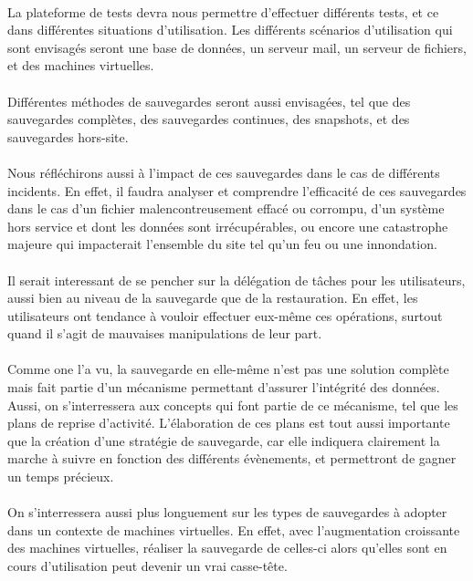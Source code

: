 \documentclass[a4paper,11pt]{report}
\begin{document}
\paragraph{}
La plateforme de tests devra nous permettre d'effectuer différents tests, et ce dans différentes situations d'utilisation.
Les différents scénarios d'utilisation qui sont envisagés seront une base de données, un serveur mail, un serveur de fichiers, et des machines virtuelles.

\paragraph{}
Différentes méthodes de sauvegardes seront aussi envisagées, tel que des sauvegardes complètes, des sauvegardes continues, des snapshots, et des sauvegardes hors-site.

\paragraph{}
Nous réfléchirons aussi à l'impact de ces sauvegardes dans le cas de différents incidents.
En effet, il faudra analyser et comprendre l'efficacité de ces sauvegardes dans le cas d'un fichier malencontreusement effacé ou corrompu, d'un système hors service et dont les données sont irrécupérables, ou encore une catastrophe majeure qui impacterait l'ensemble du site tel qu'un feu ou une innondation.

\paragraph{}
Il serait interessant de se pencher sur la délégation de tâches pour les utilisateurs, aussi bien au niveau de la sauvegarde que de la restauration.
En effet, les utilisateurs ont tendance à vouloir effectuer eux-même ces opérations, surtout quand il s'agit de mauvaises manipulations de leur part.

\paragraph{}
Comme one l'a vu, la sauvegarde en elle-même n'est pas une solution complète mais fait partie d'un mécanisme permettant d'assurer l'intégrité des données.
Aussi, on s'interressera aux concepts qui font partie de ce mécanisme, tel que les plans de reprise d'activité.
L'élaboration de ces plans est tout aussi importante que la création d'une stratégie de sauvegarde, car elle indiquera clairement la marche à suivre en fonction des différents évènements, et permettront de gagner un temps précieux.

\paragraph{}
On s'interressera aussi plus longuement sur les types de sauvegardes à adopter dans un contexte de machines virtuelles.
En effet, avec l'augmentation croissante des machines virtuelles, réaliser la sauvegarde de celles-ci alors qu'elles sont en cours d'utilisation peut devenir un vrai casse-tête.



\end{document}
